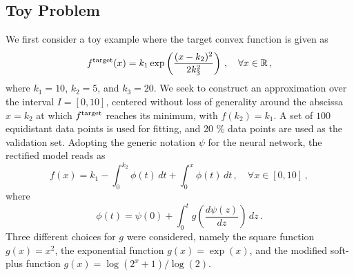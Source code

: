 \subsection{Toy Problem}\label{subsec:toy}
We first consider a toy example where the target convex function is given as
\begin{align}
        f^\textnormal{target}(x) = k_1 \exp\left( \frac{(x - k_2)^2}{2k_3^2} \right)\,, \quad \forall x \in \mathbb{R}\,,
\end{align}
where $k_1= 10$, $k_2= 5$, and $k_3= 20$. We seek to construct an approximation over the interval $I = [0, 10]$, centered without loss of generality around the abscissa $x = k_2$ at which $f^\textnormal{target}$ reaches its minimum, with $f(k_2) = k_1$. A set of $100$ equidistant data points is used for fitting, and 20 \% data points are used as the validation set. Adopting the generic notation $\psi$ for the neural network, the rectified model reads as
\begin{equation}
    f(x) = k_1 - \int_{0}^{k_2} \phi(t) \,dt + \int_{0}^x \phi(t) \,dt\,, \quad \forall x \in [0, 10]\,,
\end{equation}
where
\begin{equation}
    \phi(t) = \psi(0) + \int_{0}^t g\left(\frac{d\psi(z)}{dz}\right) \,dz\,.
\end{equation}
Three different choices for $g$ were considered, namely the square function $g(x) = x^2$, the exponential function $g(x) = \exp(x)$, and the modified soft-plus function $g(x) = \log(2^x+1)/\log(2)$. 

